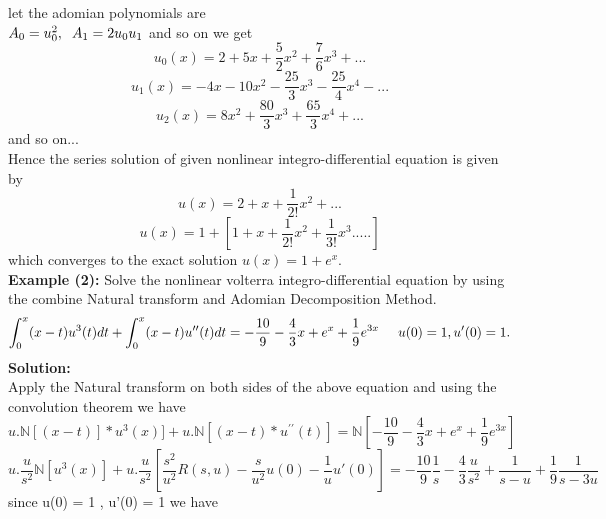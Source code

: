 let the adomian polynomials are\\
$  A_{0} = u_{0}^2, {\hspace{0.2 cm}} A_{1} = 2 u_{0}u_{1} $ {\hspace{0.2 cm}} and so on we get
\begin{equation*}
u_{0}(x) = 2 + 5x + \frac{5}{2}x^2 + \frac{7}{6}x^3 +...
\end{equation*}
\begin{equation*}
u_{1}(x) =  -4x - 10x^2 - \frac{25}{3}x^3 - \frac{25}{4}x^4 - ...    
\end{equation*}
\begin{equation*}
u_{2}(x) =  8x^2 + \frac{80}{3}x^3 + \frac{65}{3}x^4 + ...    
\end{equation*}
and so on...\\
Hence the series solution of given nonlinear integro-differential equation  is given by
\begin{equation*}
u(x) = 2 + x + \frac{1}{2!}x^2 + ...
\end{equation*}
\begin{equation*}
u(x) = 1 + [1 + x + \frac{1}{2!}x^2 + \frac{1}{3!}x^3.....]
\end{equation*}
which converges to the exact solution  $ u(x) = 1 + e^{x}$.\\
\textbf{Example (2):} Solve the nonlinear volterra integro-differential equation by using the combine Natural transform and Adomian Decomposition Method.
 \begin{equation*}
 \int_{0}^{x}(x-t)u^3(t)dt + \int_{0}^{x}(x-t)u^{\prime\prime}(t)dt = -\frac{10}{9} - \frac{4}{3}x + e^{x} + \frac{1}{9}e^{3x} {\hspace{0.5 cm}} u(0) = 1, u'(0) = 1.
 \end{equation*}
 \textbf{Solution:}\\
 Apply the Natural transform on both sides of the above equation and using the convolution theorem we have
 \begin{equation*}
u.\mathbb{N}[(x-t)]*u^3(x)] + u.\mathbb{N}[(x-t)*u^{\prime\prime}(t)] = \mathbb{N}[-\frac{10}{9} - \frac{4}{3}x + e^{x} + \frac{1}{9}e^{3x}]
\end{equation*}
 \begin{equation*}
u.\frac{u}{s^2} \mathbb{N}[u^3(x)] + u.\frac{u}{s^2}[\frac{s^2}{u^2}R(s,u) - \frac{s}{u^2}u(0) - \frac{1}{u}u'(0) ] = -\frac{10}{9}\frac{1}{s} - \frac{4}{3}\frac{u}{s^2} + \frac{1}{s-u} + \frac{1}{9}\frac{1}{s-3u}
\end{equation*}
since u(0) = 1 ,  u'(0) = 1 we have
